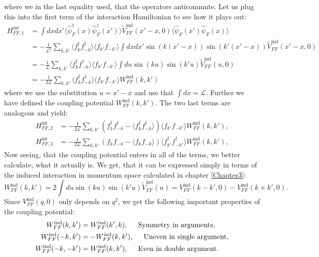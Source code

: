 where we in the last equality used, that the operators anticommute. Let us plug this into the first term of the interaction Hamiltonian to see how it plays out: 
\begin{align}
H^\text{int}_{FF,1} &= \int dxdx' \langle \hat{\psi}^\dagger_F(x) \hat{\psi}^\dagger_F(x') \rangle \tilde{V}^\text{ind}_{FF}(x'-x,0) \langle \hat{\psi}_F(x') \hat{\psi}_F(x) \rangle \nonumber \\
&= - \frac{1}{\mathcal{L}^2}\sum_{k,k'}\langle f^\dagger_{k}f^\dagger_{-k} \rangle \langle f_{k'}f_{-k'} \rangle \int dx dx' \sin(k(x'-x))\sin(k'(x'-x))\tilde{V}^\text{ind}_{FF}(x'-x,0) \nonumber \\
&= - \frac{1}{\mathcal{L}}\sum_{k,k'}\langle f^\dagger_{k}f^\dagger_{-k} \rangle \langle f_{k'}f_{-k'} \rangle \int du \sin(ku)\sin(k'u)\tilde{V}^\text{ind}_{FF}(u,0) \nonumber \\
&= - \frac{1}{2\mathcal{L}}\sum_{k,k'}\langle f^\dagger_{k}f^\dagger_{-k} \rangle \langle f_{k'}f_{-k'} \rangle W^\text{ind}_{FF}(k,k')
\end{align}
where we use the substitution $u = x'-x$ and use that $\int dx = \mathcal{L}$. Further we have defined the coupling potential $W^\text{ind}_{FF}(k,k')$. The two last terms are analogous and yield:
\begin{align}
H^\text{int}_{FF,2} &= - \frac{1}{2\mathcal{L}}\sum_{k,k'}\left(f^\dagger_k f^\dagger_{-k} - \langle f^\dagger_k f^\dagger_{-k}\rangle\right)\langle f_{k'}f_{-k'} \rangle W^\text{ind}_{FF}(k,k'), \nonumber \\
H^\text{int}_{FF,3} &= - \frac{1}{2\mathcal{L}}\sum_{k,k'}\left(f_k f_{-k} - \langle f_k f_{-k}\rangle\right)\langle f^\dagger_{k'}f^\dagger_{-k'} \rangle W^\text{ind}_{FF}(k,k'), \nonumber
\end{align}
Now seeing, that the coupling potential enters in all of the terms, we better calculate, what it actually is. We get, that it can be expressed simply in terms of the induced interaction in momentum space calculated in chapter \ref{Chapter3}:
\begin{equation}
W^\text{ind}_{FF}(k,k') = 2\int du \sin(ku)\sin(k'u)\tilde{V}^\text{ind}_{FF}(u) = V^\text{ind}_{FF}(k-k',0) - V^\text{ind}_{FF}(k+k',0).
\end{equation}
Since $V^\text{ind}_{FF}(q,0)$ only depends on $q^2$, we get the following important properties of the coupling potential: 
\begin{align}
W^\text{ind}_{FF}(k,k') &= W^\text{ind}_{FF}(k',k), \hspace{0.5cm} \text{Symmetry in arguments}, \nonumber \\
W^\text{ind}_{FF}(-k,k') &= -W^\text{ind}_{FF}(k,k'), \hspace{0.5cm} \text{Uneven in single argument}, \nonumber \\
W^\text{ind}_{FF}(-k,-k') &= W^\text{ind}_{FF}(k,k'), \hspace{0.5cm} \text{Even in double argument}.
\label{eq.CouplingPotentialSymmetries}
\end{align}
